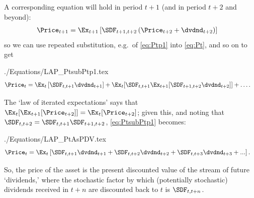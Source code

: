 \documentclass{handout}
\begin{document}
A corresponding equation will hold in period $t+1$ (and in period $t+2$ and beyond):
\begin{equation}\begin{gathered}\begin{aligned}
 \Price_{t+1} & =  \Ex_{t+1}\left[\SDF_{t+1,t+2}\left({\Price}_{t+2}+\dvdnd_{t+2}\right)\right] \label{eq:Ptp1}
\end{aligned}\end{gathered}\end{equation}
so we can use repeated substitution, e.g.\ of \eqref{eq:Ptp1} into \eqref{eq:Pt}, and so on to get
\begin{verbatimwrite}{./Equations/LAP_PtsubPtp1.tex}
\begin{equation}\begin{gathered}\begin{aligned}
 \Price_{t} & =  \Ex_{t}\left[\SDF_{t,t+1}\dvdnd_{t+1}\right]+\Ex_{t}[\SDF_{t,t+1}\Ex_{t+1}[\SDF_{t+1,t+2}\dvdnd_{t+2}]]+ \ldots \label{eq:PtsubPtp1}
.
\end{aligned}\end{gathered}\end{equation}
\end{verbatimwrite}


The `law of iterated expectations' says that
$\Ex_{t}[\Ex_{t+1}[{\Price}_{t+2}]] = \Ex_{t}[{\Price}_{t+2}]$;
given this, and noting that $\SDF_{t,t+2} = \SDF_{t,t+1}\SDF_{t+1,t+2}$, \eqref{eq:PtsubPtp1} becomes:
\begin{verbatimwrite}{./Equations/LAP_PtAsPDV.tex}
\begin{equation}\begin{gathered}\begin{aligned}
 \Price_{t} & =  \Ex_{t}\left[\SDF_{t,t+1}\dvdnd_{t+1}+\SDF_{t,t+2}\dvdnd_{t+2}+\SDF_{t,t+3}\dvdnd_{t+3}+...\right] . \label{eq:PtAsPDV}
\end{aligned}\end{gathered}\end{equation}
\end{verbatimwrite}

So, the price of the asset is the present discounted value of the stream of future `dividends,'
where the stochastic factor by which (potentially stochastic) dividends received in $t+n$ are discounted back to $t$ is $\SDF_{t,t+n}$.
\end{document}
